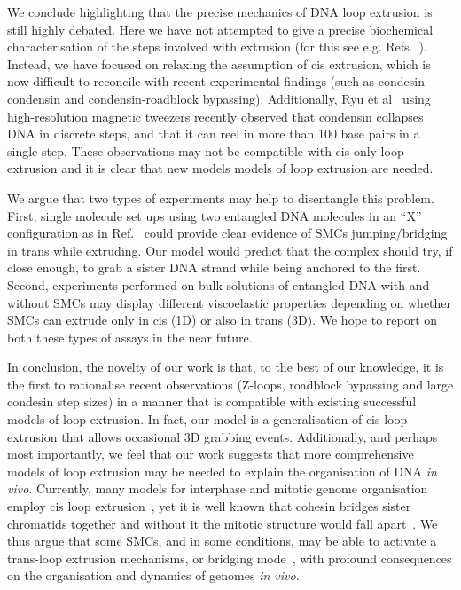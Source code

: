\documentclass[aps,prl,twocolumn,a4paper,10pt,notitlepage,footinbib,nobalancelastpage,superscriptaddress,showpacs,floatfix]{revtex4-1}%
\begin{document}
We conclude highlighting that the precise mechanics of DNA loop extrusion is still highly debated. Here we have not attempted to give a precise biochemical characterisation of the steps involved with extrusion (for this see e.g. Refs.~\cite{Marko2019,Nomidis2019}). Instead, we have focused on relaxing the assumption of cis extrusion, which is now difficult to reconcile with recent experimental findings (such as condesin-condensin and condensin-roadblock bypassing). Additionally, Ryu et al~\cite{Ryu2021stepsize} using high-resolution magnetic tweezers recently observed that condensin collapses DNA in discrete steps, and that it can reel in more than 100 base pairs in a single step. These observations may not be compatible with cis-only loop extrusion and it is clear that new models models of loop extrusion are needed.

We argue that two types of experiments may help to disentangle this problem. First, single molecule set ups using two entangled DNA molecules in an ``X'' configuration as in Ref.~\cite{Gutierrez-Escribano2019} could provide clear evidence of SMCs jumping/bridging in trans while extruding. Our model would predict that the complex should try, if close enough, to grab a sister DNA strand while being anchored to the first. Second, experiments performed on bulk solutions of entangled DNA with and without SMCs may display different viscoelastic properties depending on whether SMCs can extrude only in cis (1D) or also in trans (3D). We hope to report on both these types of assays in the near future. 

In conclusion, the novelty of our work is that, to the best of our knowledge, it is the first to rationalise recent observations (Z-loops, roadblock bypassing and large condesin step sizes) in a manner that is compatible with existing successful models of loop extrusion. In fact, our model is a generalisation of cis loop extrusion that allows occasional 3D grabbing events. Additionally, and perhaps most importantly, we feel that our work suggests that more comprehensive models of loop extrusion may be needed to explain the organisation of DNA \emph{in vivo}. Currently, many models for interphase and mitotic genome organisation employ cis loop extrusion~\cite{Fudenberg2016,Goloborodko2016a}, yet it is well known that cohesin bridges sister chromatids together and without it the mitotic structure would fall apart~\cite{Nasmyth2009,Murayama2018,Piskadlo2017a}. We thus argue that some SMCs, and in some conditions, may be able to activate a trans-loop extrusion mechanisms, or bridging mode~\cite{Ryu2021}, with profound consequences on the organisation and dynamics of genomes \emph{in vivo}.
\end{document}
